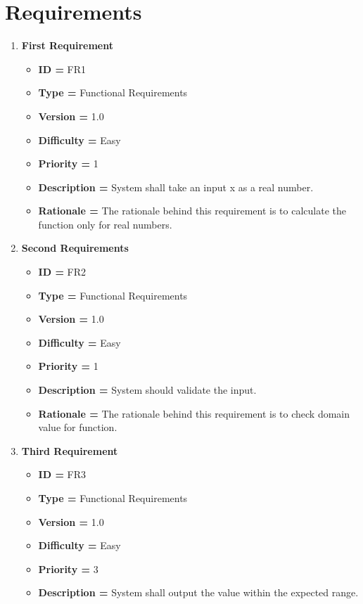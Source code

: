 \documentclass[a4paper,12pt]{article}
\begin{document}
\section {Requirements}
    \begin{enumerate}
    \item\textbf{First Requirement}
    \begin{itemize}
        \item \textbf{ID = } FR1
        \item \textbf{Type = } Functional Requirements
        \item \textbf{Version = } 1.0
        \item \textbf{Difficulty = } Easy
        \item \textbf{Priority = } 1
        \item \textbf{Description = }	System shall take an input x as a  real number.
        \item \textbf{Rationale = }	The rationale behind this requirement is to calculate the function only for real numbers.
    \end{itemize}
    \item\textbf{Second Requirements}
    \begin{itemize}
        \item \textbf{ID = } FR2
        \item \textbf{Type = } Functional Requirements
        \item \textbf{Version = } 1.0
        \item \textbf{Difficulty = } Easy
        \item \textbf{Priority = } 1
        \item \textbf{Description = } System should validate the input.
        \item \textbf{Rationale = }	The rationale behind this requirement is to check domain value for function.
    \end{itemize}
    \item\textbf{Third Requirement}
    \begin{itemize}
        \item \textbf{ID = } FR3
        \item \textbf{Type = } Functional Requirements
        \item \textbf{Version = } 1.0
        \item \textbf{Difficulty = } Easy
        \item \textbf{Priority = } 3
        \item \textbf{Description = }  System shall output the value within the expected range. 

\end{itemize}
\end{enumerate}
\end{document}
